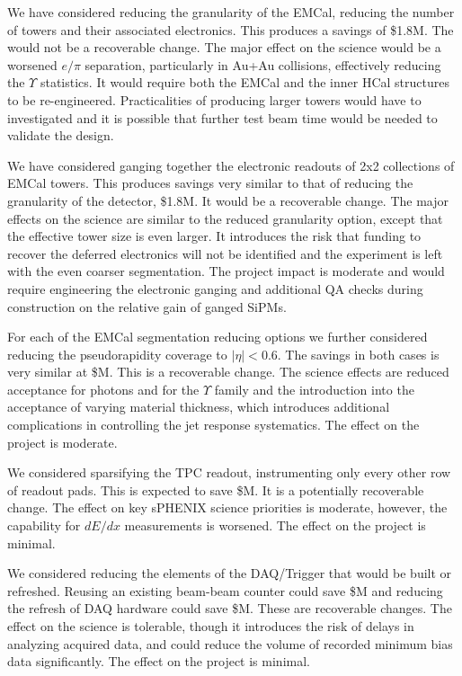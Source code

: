 We have considered reducing the granularity of the EMCal, reducing the
number of towers and their associated electronics.  This produces a
savings of \$1.8M.  The would not be a recoverable change.  The major
effect on the science would be a worsened $e/\pi$ separation,
particularly in Au+Au collisions, effectively reducing the $\Upsilon$
statistics.  It would require both the EMCal and the inner HCal
structures to be re-engineered.  Practicalities of producing larger
towers would have to investigated and it is possible that further test
beam time would be needed to validate the design.

We have considered ganging together the electronic readouts of 2x2
collections of EMCal towers. This produces savings very similar to
that of reducing the granularity of the detector, \$1.8M.  It would be
a recoverable change.  The major effects on the science are similar to
the reduced granularity option, except that the effective tower size
is even larger.  It introduces the risk that funding to recover the
deferred electronics will not be identified and the experiment is left
with the even coarser segmentation.  The project impact is moderate
and would require engineering the electronic ganging and additional QA
checks during construction on the relative gain of ganged SiPMs.

For each of the EMCal segmentation reducing options we further
considered reducing the pseudorapidity coverage to $|\eta| < 0.6$.
The savings in both cases is very similar at \${\reducedEMCaleta}M.
This is a recoverable change.  The science effects are reduced
acceptance for photons and for the $\Upsilon$ family and the
introduction into the acceptance of varying material thickness, which
introduces additional complications in controlling the jet response
systematics. The effect on the project is moderate.

We considered sparsifying the TPC readout, instrumenting only every
other row of readout pads.  This is expected to save
\${\reducedTPCreadout}M.  It is a potentially recoverable change. The
effect on key sPHENIX science priorities is moderate, however, the
capability for $dE/dx$ measurements is worsened.  The effect on the
project is minimal.

We considered reducing the elements of the DAQ/Trigger that would be
built or refreshed.  Reusing an existing beam-beam counter could save
\${\reuseBBC}M and reducing the refresh of DAQ hardware could save
\${\reducedDAQ}M.  These are recoverable changes.  The effect on the
science is tolerable, though it introduces the risk of delays in
analyzing acquired data, and could reduce the volume of recorded
minimum bias data significantly. The effect on the project is minimal.

